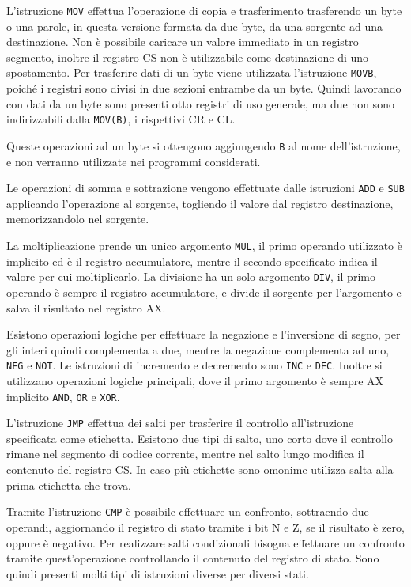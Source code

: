 \documentclass{article}
\numberwithin{equation}{subsection}
\begin{document}
L'istruzione \verb|MOV| effettua l'operazione di copia e trasferimento trasferendo un byte o una 
parole, in questa versione formata da due byte, da una sorgente ad una destinazione. Non è possibile caricare un valore immediato in 
un registro segmento, inoltre il registro CS non è utilizzabile come destinazione di uno spostamento. 
Per trasferire dati di un byte viene utilizzata l'istruzione \verb|MOVB|, poiché i registri sono divisi in due sezioni 
entrambe da un byte. Quindi lavorando con dati da un byte sono presenti otto registri di uso generale, ma due 
non sono indirizzabili dalla \verb|MOV(B)|, i rispettivi CR e CL. 

Queste operazioni ad un byte si ottengono aggiungendo \verb|B| al nome dell'istruzione, e non verranno utilizzate nei programmi considerati. 

Le operazioni di somma e sottrazione vengono effettuate dalle istruzioni \verb|ADD| e \verb|SUB| applicando l'operazione al sorgente, togliendo il valore dal registro destinazione, 
memorizzandolo nel sorgente. 

La moltiplicazione prende un unico argomento \verb|MUL|, il primo operando utilizzato è implicito ed è il registro accumulatore, mentre il secondo specificato indica 
il valore per cui moltiplicarlo. 
La divisione ha un solo argomento \verb|DIV|, il primo operando è sempre il registro accumulatore, e divide il sorgente per l'argomento e salva il risultato nel registro AX. 


Esistono operazioni logiche per effettuare la negazione e l'inversione di segno, per gli interi quindi complementa a due, mentre la negazione complementa ad uno, \verb|NEG| e 
\verb|NOT|. Le istruzioni di incremento e decremento sono \verb|INC| e \verb|DEC|. Inoltre si utilizzano operazioni logiche principali, dove il primo argomento è 
sempre AX implicito \verb|AND|, \verb|OR| e \verb|XOR|. 

L'istruzione \verb|JMP| effettua dei salti per trasferire il controllo all'istruzione specificata come etichetta. Esistono due tipi di salto, uno corto dove il controllo rimane 
nel segmento di codice corrente, mentre nel salto lungo modifica il contenuto del registro CS. 
In caso più etichette sono omonime utilizza salta alla prima etichetta che trova. 

Tramite l'istruzione \verb|CMP| è possibile effettuare un confronto, sottraendo due operandi, aggiornando il registro di stato tramite i bit N e Z, se il 
risultato è zero, oppure è negativo. 
Per realizzare salti condizionali bisogna effettuare un confronto tramite quest'operazione controllando il contenuto del registro di stato. Sono 
quindi presenti molti tipi di istruzioni diverse per diversi stati. 
\end{document}
